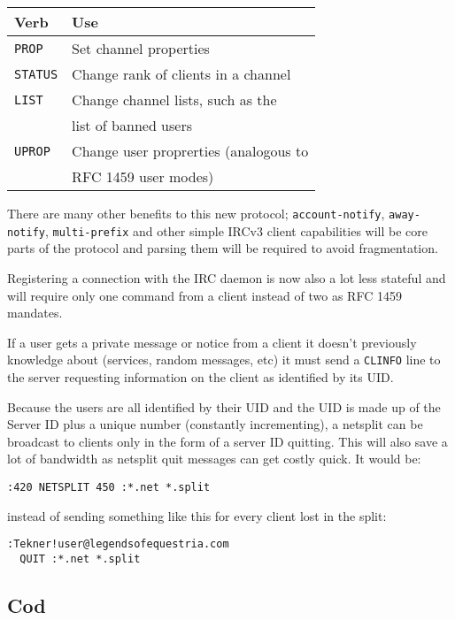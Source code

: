 \documentclass[twocolumn]{article}
\begin{document}
\vspace{0.125in}

\begin{tabular}{| l | l |}
	Verb & Use \\
    \hline
    \texttt{PROP} & Set channel properties \\
    \texttt{STATUS} & Change rank of clients in a channel \\
    \texttt{LIST} & Change channel lists, such as the \\
                  & list of banned users \\
    \texttt{UPROP} & Change user proprerties (analogous to \\
                   & RFC 1459 user modes) \\
\end{tabular}

There are many other benefits to this new protocol; \texttt{account-notify}, \texttt{away-notify}, \texttt{multi-prefix} and other simple IRCv3 client capabilities will be core parts of the protocol and parsing them will be required to avoid fragmentation.

Registering a connection with the IRC daemon is now also a lot less stateful and will require only one command from a client instead of two as RFC 1459 mandates.

If a user gets a private message or notice from a client it doesn't previously knowledge about (services, random messages, etc) it must send a \texttt{CLINFO} line to the server requesting information on the client as identified by its UID.

Because the users are all identified by their UID and the UID is made up of the Server ID plus a unique number (constantly incrementing), a netsplit can be broadcast to clients only in the form of a server ID quitting. This will also save a lot of bandwidth as netsplit quit messages can get costly quick. It would be:

\begin{verbatim}
:420 NETSPLIT 450 :*.net *.split
\end{verbatim}

instead of sending something like this for every client lost in the split:

\begin{verbatim}
:Tekner!user@legendsofequestria.com
  QUIT :*.net *.split
\end{verbatim}

\subsection{Cod}
\end{document}
